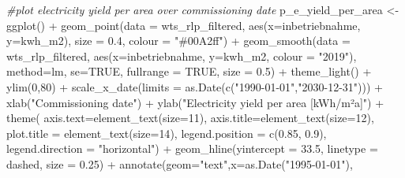 \documentclass[a4paper,11pt]{article}
\newenvironment{Shaded}{\begin{snugshade}}{\end{snugshade}}
\newcommand{\AttributeTok}[1]{\textcolor[rgb]{0.77,0.63,0.00}{#1}}
\newcommand{\CommentTok}[1]{\textcolor[rgb]{0.56,0.35,0.01}{\textit{#1}}}
\newcommand{\ConstantTok}[1]{\textcolor[rgb]{0.00,0.00,0.00}{#1}}
\newcommand{\DecValTok}[1]{\textcolor[rgb]{0.00,0.00,0.81}{#1}}
\newcommand{\FloatTok}[1]{\textcolor[rgb]{0.00,0.00,0.81}{#1}}
\newcommand{\FunctionTok}[1]{\textcolor[rgb]{0.00,0.00,0.00}{#1}}
\newcommand{\NormalTok}[1]{#1}
\newcommand{\OtherTok}[1]{\textcolor[rgb]{0.56,0.35,0.01}{#1}}
\newcommand{\SpecialCharTok}[1]{\textcolor[rgb]{0.00,0.00,0.00}{#1}}
\newcommand{\StringTok}[1]{\textcolor[rgb]{0.31,0.60,0.02}{#1}}
\begin{document}
\begin{Shaded}
\begin{Highlighting}[]
\CommentTok{\#plot electricity yield per area over commissioning date}
\NormalTok{p\_e\_yield\_per\_area }\OtherTok{\textless{}{-}} \FunctionTok{ggplot}\NormalTok{() }\SpecialCharTok{+}
  \FunctionTok{geom\_point}\NormalTok{(}\AttributeTok{data =}\NormalTok{ wts\_rlp\_filtered, }\FunctionTok{aes}\NormalTok{(}\AttributeTok{x=}\NormalTok{inbetriebnahme, }\AttributeTok{y=}\NormalTok{kwh\_m2), }
             \AttributeTok{size =} \FloatTok{0.4}\NormalTok{, }\AttributeTok{colour =} \StringTok{"\#00A2ff"}\NormalTok{) }\SpecialCharTok{+}
  \FunctionTok{geom\_smooth}\NormalTok{(}\AttributeTok{data =}\NormalTok{ wts\_rlp\_filtered, }
              \FunctionTok{aes}\NormalTok{(}\AttributeTok{x=}\NormalTok{inbetriebnahme, }\AttributeTok{y=}\NormalTok{kwh\_m2, }\AttributeTok{colour =} \StringTok{"2019"}\NormalTok{), }
              \AttributeTok{method=}\NormalTok{lm, }\AttributeTok{se=}\ConstantTok{TRUE}\NormalTok{, }\AttributeTok{fullrange =} \ConstantTok{TRUE}\NormalTok{, }\AttributeTok{size =} \FloatTok{0.5}\NormalTok{)  }\SpecialCharTok{+}
  \FunctionTok{theme\_light}\NormalTok{() }\SpecialCharTok{+}
  \FunctionTok{ylim}\NormalTok{(}\DecValTok{0}\NormalTok{,}\DecValTok{80}\NormalTok{) }\SpecialCharTok{+}
  \FunctionTok{scale\_x\_date}\NormalTok{(}\AttributeTok{limits =} \FunctionTok{as.Date}\NormalTok{(}\FunctionTok{c}\NormalTok{(}\StringTok{"1990{-}01{-}01"}\NormalTok{,}\StringTok{"2030{-}12{-}31"}\NormalTok{))) }\SpecialCharTok{+}
  \FunctionTok{xlab}\NormalTok{(}\StringTok{"Commissioning date"}\NormalTok{) }\SpecialCharTok{+}
  \FunctionTok{ylab}\NormalTok{(}\StringTok{"Electricity yield per area [kWh/m²a]"}\NormalTok{) }\SpecialCharTok{+}
  \FunctionTok{theme}\NormalTok{( }\AttributeTok{axis.text=}\FunctionTok{element\_text}\NormalTok{(}\AttributeTok{size=}\DecValTok{11}\NormalTok{),}
         \AttributeTok{axis.title=}\FunctionTok{element\_text}\NormalTok{(}\AttributeTok{size=}\DecValTok{12}\NormalTok{),}
         \AttributeTok{plot.title =} \FunctionTok{element\_text}\NormalTok{(}\AttributeTok{size=}\DecValTok{14}\NormalTok{),}
         \AttributeTok{legend.position =} \FunctionTok{c}\NormalTok{(}\FloatTok{0.85}\NormalTok{, }\FloatTok{0.9}\NormalTok{),}
         \AttributeTok{legend.direction =} \StringTok{"horizontal"}\NormalTok{) }\SpecialCharTok{+}
  \FunctionTok{geom\_hline}\NormalTok{(}\AttributeTok{yintercept =} \FloatTok{33.5}\NormalTok{, }\AttributeTok{linetype =} \StringTok{\textquotesingle{}dashed\textquotesingle{}}\NormalTok{, }\AttributeTok{size =} \FloatTok{0.25}\NormalTok{) }\SpecialCharTok{+}
  \FunctionTok{annotate}\NormalTok{(}\AttributeTok{geom=}\StringTok{"text"}\NormalTok{,}\AttributeTok{x=}\FunctionTok{as.Date}\NormalTok{(}\StringTok{"1995{-}01{-}01"}\NormalTok{),}

\end{Highlighting}
\end{Shaded}
\end{document}
